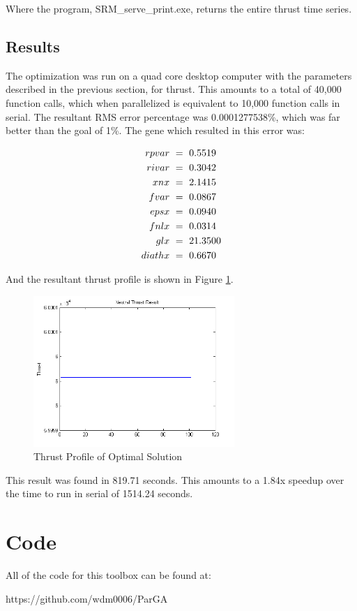\documentclass[conference]{IEEEtran}
\begin{document}
Where the program, SRM\_serve\_print.exe, returns the entire thrust time series.

\subsection{Results}

The optimization was run on a quad core desktop computer with the parameters described in the previous section, for thrust.  This amounts to a total of 40,000 function calls, which when parallelized is equivalent to 10,000 function calls in serial.  The resultant RMS error percentage was 0.0001277538\%, which was far better than the goal of 1\%.  The gene which resulted in this error was:

\begin{align}\notag
rpvar\ &=\ 0.5519\\\notag
 rivar\ &=\ 0.3042\\\notag 
 xnx\ &=\ 2.1415\\\notag
 fvar\ &=\ 0.0867\\\notag
  epsx\ &=\ 0.0940\\\notag
fnlx\ &=\ 0.0314\\\notag
glx\ &=\ 21.3500\\\notag
 diathx\ &=\ 0.6670\notag
 \end{align}

And the resultant thrust profile is shown in Figure \ref{fig:thrust}.

\begin{figure}[h!t]
 \centering
    \includegraphics[width=3in]{thrust.PNG}
    \caption{Thrust Profile of Optimal Solution}
    \label{fig:thrust}
\end{figure}


This result was found in 819.71 seconds.  This amounts to a 1.84x speedup over the time to run in serial of 1514.24 seconds. 

\section{Code}

All of the code for this toolbox can be found at:

https://github.com/wdm0006/ParGA
% 
%
\end{document}
